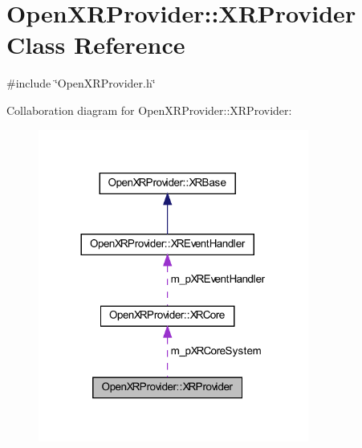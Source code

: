 \hypertarget{class_open_x_r_provider_1_1_x_r_provider}{}\section{Open\+X\+R\+Provider\+::X\+R\+Provider Class Reference}
\label{class_open_x_r_provider_1_1_x_r_provider}


{\ttfamily \#include \char`\"{}Open\+X\+R\+Provider.\+h\char`\"{}}



Collaboration diagram for Open\+X\+R\+Provider\+::X\+R\+Provider\+:
\nopagebreak
\begin{figure}[H]
\begin{center}
\leavevmode
\includegraphics[width=252pt]{class_open_x_r_provider_1_1_x_r_provider__coll__graph}
\end{center}
\end{figure}
